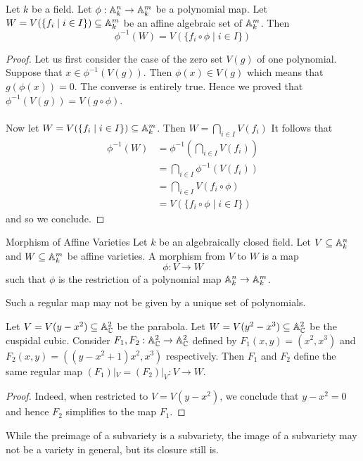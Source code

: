 \documentclass[a4paper]{article}
\begin{document}
\begin{prp}{}{} Let $k$ be a field. Let $\phi:\mathbb{A}_k^n\to\mathbb{A}_k^m$ be a polynomial map. Let $W=V(\{f_i\;|\;i\in I\})\subseteq\mathbb{A}_k^m$ be an affine algebraic set of $\mathbb{A}_k^m$. Then $$\phi^{-1}(W)=V(\{f_i\circ\phi\;|\;i\in I\})$$ \tcbline
\begin{proof}
Let us first consider the case of the zero set $V(g)$ of one polynomial. Suppose that $x\in\phi^{-1}(V(g))$. Then $\phi(x)\in V(g)$ which means that $g(\phi(x))=0$. The converse is entirely true. Hence we proved that $\phi^{-1}(V(g))=V(g\circ\phi)$. \\~\\

Now let $W=V(\{f_i\;|\;i\in I\})\subseteq\mathbb{A}_k^m$. Then $W=\bigcap_{i\in I}V(f_i)$ It follows that 
\begin{align*}
\phi^{-1}(W)&=\phi^{-1}\left(\bigcap_{i\in I}V(f_i)\right)\\
&=\bigcap_{i\in I}\phi^{-1}\left(V(f_i)\right)\\
&=\bigcap_{i\in I}V(f_i\circ\phi)\\
&=V(\{f_i\circ\phi\;|\;i\in I\})
\end{align*}
and so we conclude. 
\end{proof}
\end{prp}

\begin{defn}{Morphism of Affine Varieties}{} Let $k$ be an algebraically closed field. Let $V\subseteq\mathbb{A}_k^n$ and $W\subseteq\mathbb{A}_k^m$ be affine varieties. A morphism from $V$ to $W$ is a map $$\phi:V\to W$$ such that $\phi$ is the restriction of a polynomial map $\mathbb{A}_k^n\to\mathbb{A}_k^m$. 
\end{defn}

Such a regular map may not be given by a unique set of polynomials. 

\begin{eg}{}{} Let $V=V(y-x^2)\subseteq\mathbb{A}_{\mathbb{C}}^2$ be the parabola. Let $W=V(y^2-x^3)\subseteq\mathbb{A}_{\mathbb{C}}^2$ be the cuspidal cubic. Consider $F_1,F_2:\mathbb{A}_{\mathbb{C}}^2\to\mathbb{A}_{\mathbb{C}}^2$ defined by $F_1(x,y)=(x^2,x^3)$ and $F_2(x,y)=((y-x^2+1)x^2,x^3)$ respectively. Then $F_1$ and $F_2$ define the same regular map $(F_1)|_V=(F_2)|_V:V\to W$. \tcbline
\begin{proof}
Indeed, when restricted to $V=V(y-x^2)$, we conclude that $y-x^2=0$ and hence $F_2$ simplifies to the map $F_1$. 
\end{proof}
\end{eg}

While the preimage of a subvariety is a subvariety, the image of a subvariety may not be a variety in general, but its closure still is. 
\end{document}
